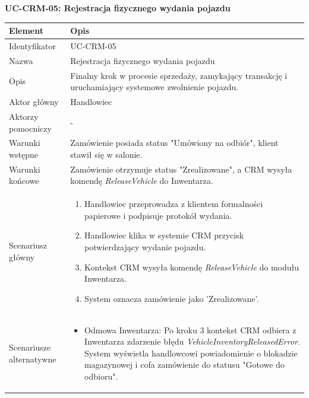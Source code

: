 \textbf{UC-CRM-05: Rejestracja fizycznego wydania pojazdu}

\begin{longtable}{|p{4cm}|p{11cm}|}
\hline
\textbf{Element} & \textbf{Opis} \\
\hline

Identyfikator & UC-CRM-05 \\
\hline

Nazwa & Rejestracja fizycznego wydania pojazdu \\
\hline

Opis & 
Finalny krok w procesie sprzedaży, zamykający transakcję i uruchamiający systemowe zwolnienie pojazdu. \\
\hline

Aktor główny & Handlowiec \\
\hline

Aktorzy pomocniczy & - \\
\hline

Warunki wstępne & 
Zamówienie posiada status "Umówiony na odbiór", klient stawił się w salonie. \\
\hline

Warunki końcowe & 
Zamówienie otrzymuje status "Zrealizowane", a CRM wysyła komendę \textit{ReleaseVehicle} do Inwentarza. \\
\hline

Scenariusz główny & 
\begin{enumerate}
    \item Handlowiec przeprowadza z klientem formalności papierowe i podpisuje protokół wydania.
    \item Handlowiec klika w systemie CRM przycisk potwierdzający wydanie pojazdu.
    \item Kontekst CRM wysyła komendę \textit{ReleaseVehicle} do modułu Inwentarza.
    \item System oznacza zamówienie jako 'Zrealizowane'.
\end{enumerate} \\
\hline

Scenariusze alternatywne & 
\begin{itemize}
    \item [A1] Odmowa Inwentarza: Po kroku 3 kontekst CRM odbiera z Inwentarza zdarzenie błędu \textit{VehicleInventoryReleasedError}. System wyświetla handlowcowi powiadomienie o blokadzie magazynowej i cofa zamówienie do statusu "Gotowe do odbioru".
\end{itemize} \\
\hline
\end{longtable}